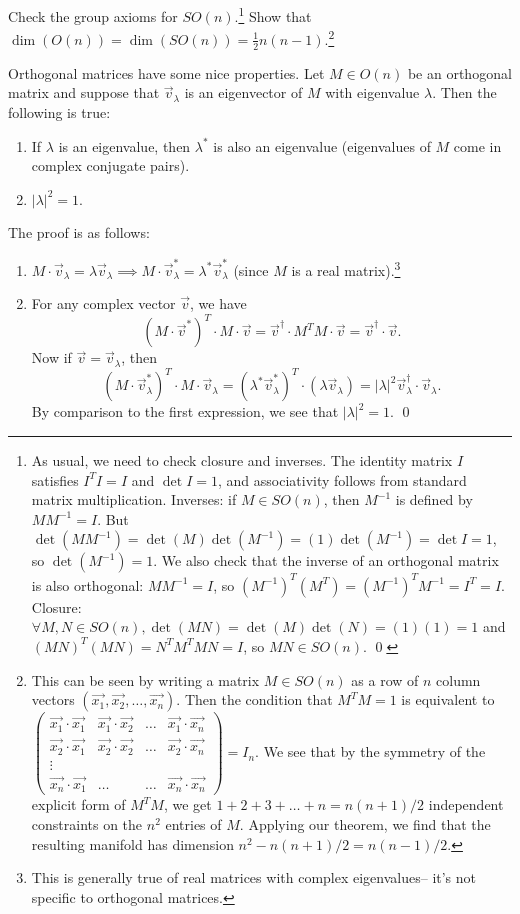 \begin{ex}\label{groupaxiomsson}
Check the group axioms for $SO(n)$.\footnote{As usual, we need to check closure and inverses. The identity matrix $I$ satisfies $I^TI=I$ and $\det I=1$, and associativity follows from standard matrix multiplication. Inverses: if $M\in SO(n)$, then $M^{-1}$ is defined by $MM^{-1}=I$. But $\det(MM^{-1})=\det(M)\det(M^{-1})=(1)\det(M^{-1})=\det I = 1$, so $\det(M^{-1})=1$. We also check that the inverse of an orthogonal matrix is also orthogonal: $M M^{-1}=I$, so $(M^{-1})^T (M^T)= (M^{-1})^T M^{-1} =I^T = I$. Closure: $\forall M,N \in SO(n), \det(MN)=\det(M)\det(N)=(1)(1)=1$ and $(MN)^T(MN)=N^TM^T M N= I$, so $MN\in SO(n)$. \qed}
Show that $\dim(O(n))=\dim(SO(n))=\frac{1}{2} n(n-1)$.\footnote{This can be seen by writing a matrix $M\in SO(n)$ as a row of $n$ column vectors $(\vec{x_1},\vec{x_2},\ldots,\vec{x_n})$. Then the condition that $M^T M = 1$ is equivalent to
$\begin{pmatrix}
\vec{x_1}\cdot \vec{x_1} & \vec{x_1}\cdot \vec{x_2} & \ldots &\vec{x_1}\cdot \vec{x_n}\\
\vec{x_2}\cdot \vec{x_1} & \vec{x_2}\cdot \vec{x_2} & \ldots &\vec{x_2}\cdot \vec{x_n}\\
\vdots\\
\vec{x_n}\cdot \vec{x_1}& \ldots & \ldots & \vec{x_n} \cdot \vec{x_n}
\end{pmatrix}= I_n.$
We see that by the symmetry of the explicit form of $M^T M$, we get $1+2+3+\ldots+n = n(n+1)/2$ independent constraints on the $n^2$ entries of $M$. Applying our theorem, we find that the resulting manifold has dimension $n^2-n(n+1)/2=n(n-1)/2$.
} 
\end{ex}

Orthogonal matrices have some nice properties. Let $M \in O(n)$ be an orthogonal matrix and suppose that $\vec{v}_\lambda$ is an eigenvector of $M$ with eigenvalue $\lambda.$ Then the following is true:
\begin{enumerate}
\item If $\lambda$ is an eigenvalue, then $\lambda^*$ is also an eigenvalue (eigenvalues of $M$ come in complex conjugate pairs).
\item $|\lambda|^2=1$.
\end{enumerate}
The proof is as follows:
\begin{enumerate}
\item $M\cdot \vec{v}_\lambda = \lambda \vec{v}_\lambda \implies M\cdot \vec{v}_\lambda^* = \lambda^* \vec{v}_\lambda^*$ (since $M$ is a real matrix).\footnote{This is generally true of real matrices with complex eigenvalues-- it's not specific to orthogonal matrices.}
\item For any complex vector $\vec{v}$, we have
$$(M\cdot \vec{v}^*)^T \cdot M \cdot \vec{v} = \vec{v}^\dagger \cdot M^T M \cdot \vec{v} = \vec{v}^\dagger \cdot \vec{v}.$$ Now if $\vec{v}=\vec{v}_\lambda$, then
$$(M\cdot \vec{v}_\lambda^*)^T \cdot M \cdot \vec{v}_\lambda=(\lambda^* \vec{v}^*_\lambda)^T \cdot (\lambda \vec{v}_\lambda)=|\lambda|^2 \vec{v}_\lambda^\dagger \cdot \vec{v}_\lambda.$$
By comparison to the first expression, we see that $|\lambda|^2=1$. \qed
\end{enumerate}

